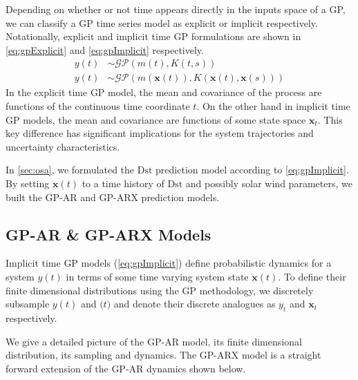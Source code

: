 Depending on whether or not time appears directly in the inputs space of a GP, we can classify a GP time series 
model as explicit or implicit respectively. Notationally, explicit and implicit time GP formulations are shown 
in \cref{eq:gpExplicit} and \cref{eq:gpImplicit} respectively.
%
\begin{align}
    y(t) &\sim \mathcal{GP}(m(t), K(t, s)) \label{eq:gpExplicit}\\
    y(t) &\sim \mathcal{GP}(m(\mathbf{x}(t)), K(\mathbf{x}(t), \mathbf{x}(s))) \label{eq:gpImplicit}
\end{align}
%
In the explicit time GP model, the mean and covariance of the process are functions of the continuous time 
coordinate $t$. On the other hand in implicit time GP models, the mean and covariance are functions of some 
state space $\mathbf{x}_t$. This key difference has significant implications for the system trajectories and 
uncertainty characteristics.

In \cref{sec:osa}, we formulated the $\mathrm{Dst}$ prediction model according to \cref{eq:gpImplicit}. 
By setting $\mathbf{x}(t)$ to a time history of $\mathrm{Dst}$ and possibly solar wind parameters, we built the 
GP-AR and GP-ARX prediction models.


\subsection*{GP-AR \& GP-ARX Models}

Implicit time GP models (\cref{eq:gpImplicit}) define probabilistic dynamics for a system $y(t)$ in terms
of some time varying system state $\mathbf{x}(t)$. To define their finite dimensional distributions using the 
GP methodology, we discretely subsample $y(t)$ and $\mathbf(t)$ and denote their discrete analogues as $y_t$ and 
$\mathbf{x}_t$ respectively.  

We give a detailed picture of the GP-AR model, its finite dimensional distribution, its sampling and dynamics. 
The GP-ARX model is a straight forward extension of the GP-AR dynamics shown below.


